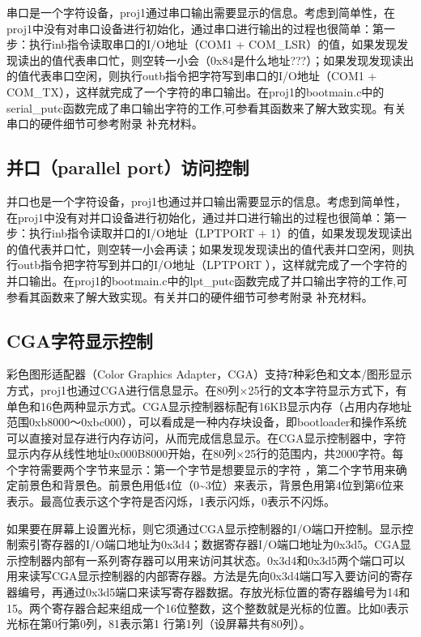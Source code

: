 串口是一个字符设备，proj1通过串口输出需要显示的信息。考虑到简单性，在proj1中没有对串口设备进行初始化，通过串口进行输出的过程也很简单：第一步：执行inb指令读取串口的I/O地址（COM1
+
COM\_LSR）的值，如果发现发现读出的值代表串口忙，则空转一小会（0x84是什么地址???）；如果发现发现读出的值代表串口空闲，则执行outb指令把字符写到串口的I/O地址（COM1
+
COM\_TX），这样就完成了一个字符的串口输出。在proj1的bootmain.c中的serial\_putc函数完成了串口输出字符的工作,可参看其函数来了解大致实现。有关串口的硬件细节可参考附录
补充材料。

\subsection{并口（parallel
port）访问控制}\label{ux5e76ux53e3parallel-portux8bbfux95eeux63a7ux5236}

并口也是一个字符设备，proj1也通过并口输出需要显示的信息。考虑到简单性，在proj1中没有对并口设备进行初始化，通过并口进行输出的过程也很简单：第一步：执行inb指令读取并口的I/O地址（LPTPORT
+
1）的值，如果发现发现读出的值代表并口忙，则空转一小会再读；如果发现发现读出的值代表并口空闲，则执行outb指令把字符写到并口的I/O地址（LPTPORT
），这样就完成了一个字符的并口输出。在proj1的bootmain.c中的lpt\_putc函数完成了并口输出字符的工作,可参看其函数来了解大致实现。有关并口的硬件细节可参考附录
补充材料。

\subsection{CGA字符显示控制}\label{cgaux5b57ux7b26ux663eux793aux63a7ux5236}

彩色图形适配器（Color Graphics
Adapter，CGA）支持7种彩色和文本/图形显示方式，proj1也通过CGA进行信息显示。在80列×25行的文本字符显示方式下，有单色和16色两种显示方式。CGA显示控制器标配有16KB显示内存（占用内存地址范围0xb8000～0xbc000），可以看成是一种内存块设备，即bootloader和操作系统可以直接对显存进行内存访问，从而完成信息显示。在CGA显示控制器中，字符显示内存从线性地址0x000B8000开始，在80列×25行的范围内，共2000字符。每个字符需要两个字节来显示：第一个字节是想要显示的字符
，第二个字节用来确定前景色和背景色。前景色用低4位（0\textasciitilde{}3位）来表示，背景色用第4位到第6位来表示。最高位表示这个字符是否闪烁，1表示闪烁，0表示不闪烁。

如果要在屏幕上设置光标，则它须通过CGA显示控制器的I/O端口开控制。显示控制索引寄存器的I/O端口地址为0x3d4；数据寄存器I/O端口地址为0x3d5。CGA显示控制器内部有一系列寄存器可以用来访问其状态。0x3d4和0x3d5两个端口可以用来读写CGA显示控制器的内部寄存器。方法是先向0x3d4端口写入要访问的寄存器编号，再通过0x3d5端口来读写寄存器数据。存放光标位置的寄存器编号为14和15。两个寄存器合起来组成一个16位整数，这个整数就是光标的位置。比如0表示光标在第0行第0列，81表示第1
行第1列（设屏幕共有80列）。

